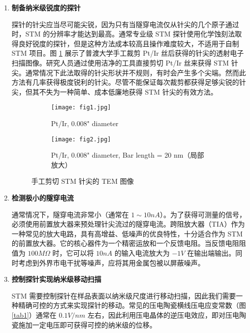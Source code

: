 \documentclass{article}
\begin{document}
\begin{enumerate}
	\item \textbf{制备纳米级锐度的探针}\par
	      \qquad 探针的针尖应当尽可能尖锐，因为只有当隧穿电流仅从针尖的几个原子通过时，STM 的分辨率才能达到最高。通常专业级 STM 探针使用化学蚀刻法取得良好锐度的探针，但是这种方法成本较高且操作难度较大，不适用于自制 STM 项目。图 \ref{fig5} 展示了普渡大学手工裁剪 Pt/Ir 丝后获得的针尖的透射电子扫描图像\cite{ref19}。研究人员通过使用洁净的工具直接剪切 Pt/Ir 丝来获得 STM 针尖。通常情况下此法取得的针尖形状并不规则，有时会产生多个尖端。然而此方法有几率获得极度锐利的针尖。尽管不能保证每次裁剪都获得足够尖锐的针尖，但其不失为一种简单、成本低廉地获得 STM 针尖的有效方法。

	      \begin{figure}[!h]
		      \centering
		      \begin{subfigure}{0.35\linewidth}
			      \centering
			      \texttt{[image: fig1.jpg]}
			      \caption{Pt/Ir, 0.008" diameter\\\quad}
		      \end{subfigure}
		      \hskip 1.5cm
		      \begin{subfigure}{0.35\linewidth}
			      \centering
			      \texttt{[image: fig2.jpg]}
			      \caption{Pt/Ir, 0.008" diameter, Bar length = 20 nm（局部放大）}
		      \end{subfigure}
		      \caption{手工剪切 STM 针尖的 TEM 图像}
		      \label{fig5}
	      \end{figure}

	\item \textbf{检测极小的隧穿电流}\par
	      \qquad 通常情况下，隧穿电流非常小（通常在 $1\sim10nA$）。为了获得可测量的信号，必须使用前置放大器来预处理针尖流过的隧穿电流。跨阻放大器（TIA）作为一种常见的放大电路，具有高增益、低噪声的优良特性，十分适合作为 STM 的前置放大器。它的核心器件为一个精密运放和一个反馈电阻。当反馈电阻阻值为 $100M\Omega$ 时，它可以将 $10nA$ 的输入电流放大为 $-1V$ 在输出端输出\cite{ref11,ref12,ref17}。同时考虑到外界市电干扰等噪声，应将其用金属包被以屏蔽噪声。

	\item \textbf{控制探针实现纳米级移动扫描}\par
	      \qquad STM 需要控制探针在样品表面以纳米级尺度进行移动扫描，因此我们需要一种精确可控的方式来实现探针的移动。常见的压电陶瓷横线压电应变常数（图 \ref{tab1}）通常在 $0.1V/nm$ 左右，因此利用压电晶体的逆压电效应，即对压电陶瓷施加一定电压即可获得可控的纳米级的位移。


\end{enumerate}
\end{document}
